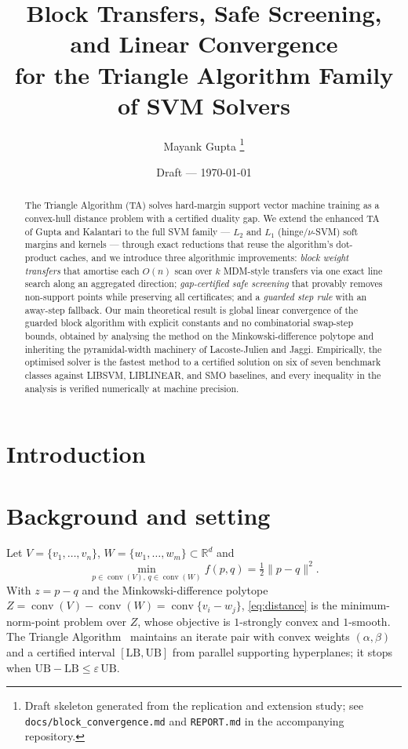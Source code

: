 \documentclass[11pt]{article}
\title{Block Transfers, Safe Screening, and Linear Convergence\\
for the Triangle Algorithm Family of SVM Solvers}
\author{Mayank Gupta
\thanks{Draft skeleton generated from the replication and extension study;
see \texttt{docs/block\_convergence.md} and \texttt{REPORT.md} in the
accompanying repository.}}
\date{Draft --- \today}
\theoremstyle{remark}
\newcommand{\conv}{\operatorname{conv}}
\newcommand{\norm}[1]{\lVert #1 \rVert}
\begin{document}
\maketitle

\begin{abstract}
The Triangle Algorithm (TA) solves hard-margin support vector machine
training as a convex-hull distance problem with a certified duality gap.
We extend the enhanced TA of Gupta and Kalantari to the full SVM family
--- $L_2$ and $L_1$ (hinge/$\nu$-SVM) soft margins and kernels --- through
exact reductions that reuse the algorithm's dot-product caches, and we
introduce three algorithmic improvements: \emph{block weight transfers}
that amortise each $O(n)$ scan over $k$ MDM-style transfers via one exact
line search along an aggregated direction; \emph{gap-certified safe
screening} that provably removes non-support points while preserving all
certificates; and a \emph{guarded step rule} with an away-step fallback.
Our main theoretical result is global linear convergence of the guarded
block algorithm with explicit constants and no combinatorial swap-step
bounds, obtained by analysing the method on the Minkowski-difference
polytope and inheriting the pyramidal-width machinery of Lacoste-Julien
and Jaggi. Empirically, the optimised solver is the fastest method to a
certified solution on six of seven benchmark classes against LIBSVM,
LIBLINEAR, and SMO baselines, and every inequality in the analysis is
verified numerically at machine precision.
\end{abstract}

\section{Introduction}

\section{Background and setting}
Let $V=\{v_1,\dots,v_n\}$, $W=\{w_1,\dots,w_m\}\subset\mathbb{R}^d$ and
\begin{equation}
  \min_{p\in\conv(V),\,q\in\conv(W)} f(p,q)=\tfrac12\norm{p-q}^2 .
  \label{eq:distance}
\end{equation}
With $z=p-q$ and the Minkowski-difference polytope
$Z=\conv(V)-\conv(W)=\conv\{v_i-w_j\}$, \eqref{eq:distance} is the
minimum-norm-point problem over $Z$, whose objective is $1$-strongly
convex and $1$-smooth. The Triangle Algorithm~\cite{kalantari,gupta}
maintains an iterate pair with convex weights $(\alpha,\beta)$ and a
certified interval $[\mathrm{LB},\mathrm{UB}]$ from parallel supporting
hyperplanes; it stops when
$\mathrm{UB}-\mathrm{LB}\le\varepsilon\,\mathrm{UB}$.
\end{document}
